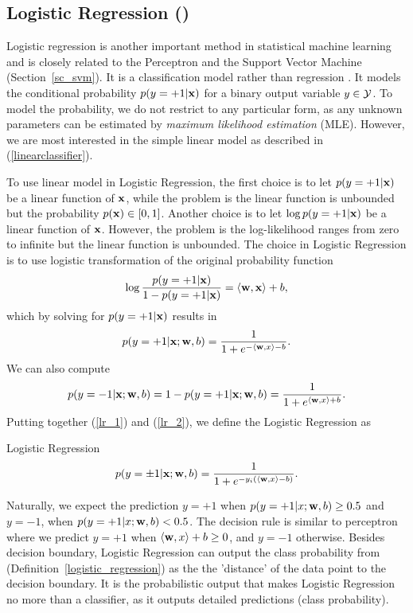%
\subsection{Logistic Regression (\lr)}

Logistic regression is another important method in statistical machine learning and is closely related to the Perceptron and the Support Vector Machine (Section~\ref{sc_svm}).
It is a classification model rather than regression \citep{Bishop07}.
It models the conditional probability $p(y=+1|\mathbf {x})$ for a binary output variable $y\in\mathcal{Y}$.
To model the probability, we do not restrict to any particular form, as any unknown parameters can be estimated by \textit{maximum likelihood estimation} (MLE).
However, we are most interested in the simple linear model as described in (\ref{linearclassifier}).

To use linear model in Logistic Regression, the first choice is to let $p(y=+1|\mathbf {x})$ be a linear function of $\mathbf {x}$, while the problem is the linear function is unbounded but the probability $p(\mathbf {x})\in[0,1]$.
Another choice is to let $\log p(y=+1|\mathbf {x})$ be a linear function of $\mathbf {x}$. 
However, the problem is the log-likelihood ranges from zero to infinite but the linear function is unbounded.
The choice in Logistic Regression is to use logistic transformation of the original probability function
\begin{align*}
	\log\frac{p(y=+1|\mathbf {x})}{1-p(y=+1|\mathbf {x})} = \langle \mathbf {w}, \mathbf {x} \rangle + b,
\end{align*}
which by solving for $p(y=+1|\mathbf {x})$ results in 
\begin{align}
	p(y=+1|\mathbf {x};\mathbf {w},b) = \frac{1}{1+e^{ -\langle \mathbf {w}, x \rangle-b }}. \label{lr_1}
\end{align}
We can also compute
\begin{align}
	p(y=-1|\mathbf {x};\mathbf {w},b)=1-p(y=+1|\mathbf {x};\mathbf {w},b)=\frac{1}{1+e^{ \langle \mathbf {w}, x \rangle+b }}. \label{lr_2}
\end{align}
Putting together (\ref{lr_1}) and (\ref{lr_2}), we define the Logistic Regression as
\begin{definition}{Logistic Regression}\label{logistic_regression}
	\begin{align*}
		p(y=\pm1|\mathbf {x};\mathbf {w},b) = \frac{1}{1+e^{ -y_i(\langle \mathbf {w}, x \rangle-b) }}.
	\end{align*}
\end{definition}
Naturally, we expect the prediction $y=+1$ when $p(y=+1|x;\mathbf {w},b)\ge0.5$ and $y=-1$, when $p(y=+1|x;\mathbf {w},b)<0.5$.
The decision rule is similar to perceptron where we predict $y=+1$ when $\langle \mathbf {w}, x \rangle+b\ge0$, and $y=-1$ otherwise.
Besides decision boundary, Logistic Regression can output the class probability from (Definition~\ref{logistic_regression}) as the the 'distance' of the data point to the decision boundary.
It is the probabilistic output that makes Logistic Regression no more than a classifier, as it outputs detailed predictions (class probability).


